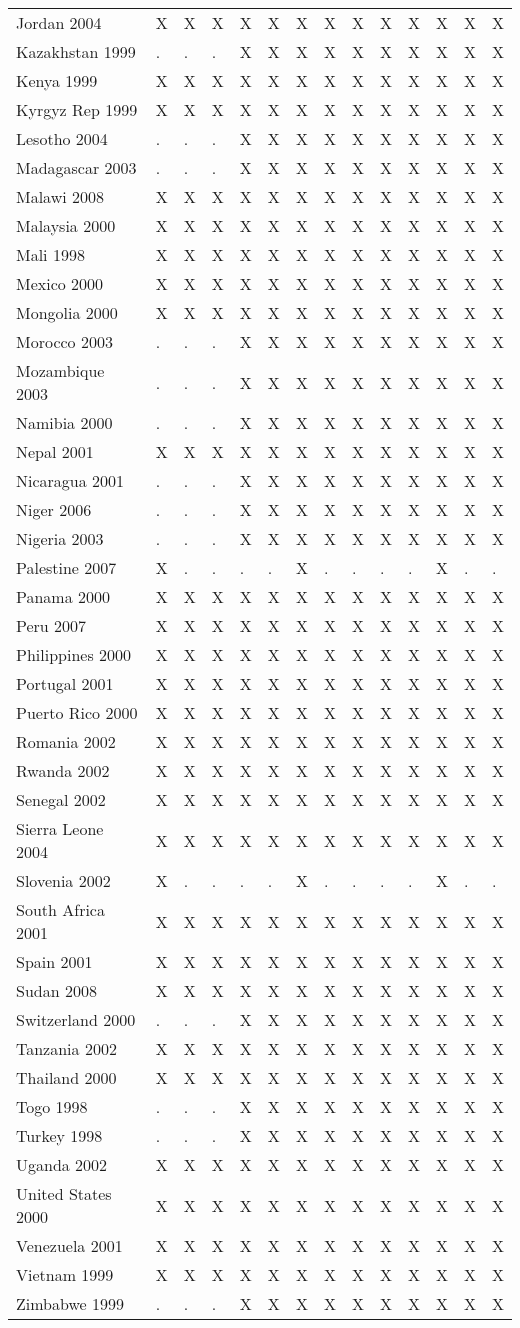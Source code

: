 \documentclass[a4paper]{article}
\begin{document}
\begin{longtable}{llllllllllllll}
Jordan 2004&X&X&X&X&X&X&X&X&X&X&X&X&X\tabularnewline
Kazakhstan 1999&.&.&.&X&X&X&X&X&X&X&X&X&X\tabularnewline
Kenya 1999&X&X&X&X&X&X&X&X&X&X&X&X&X\tabularnewline
Kyrgyz Rep 1999&X&X&X&X&X&X&X&X&X&X&X&X&X\tabularnewline
Lesotho 2004&.&.&.&X&X&X&X&X&X&X&X&X&X\tabularnewline
Madagascar 2003&.&.&.&X&X&X&X&X&X&X&X&X&X\tabularnewline
Malawi 2008&X&X&X&X&X&X&X&X&X&X&X&X&X\tabularnewline
Malaysia 2000&X&X&X&X&X&X&X&X&X&X&X&X&X\tabularnewline
Mali 1998&X&X&X&X&X&X&X&X&X&X&X&X&X\tabularnewline
\newpage
Mexico 2000&X&X&X&X&X&X&X&X&X&X&X&X&X\tabularnewline
Mongolia 2000&X&X&X&X&X&X&X&X&X&X&X&X&X\tabularnewline
Morocco 2003&.&.&.&X&X&X&X&X&X&X&X&X&X\tabularnewline
Mozambique 2003&.&.&.&X&X&X&X&X&X&X&X&X&X\tabularnewline
Namibia 2000&.&.&.&X&X&X&X&X&X&X&X&X&X\tabularnewline
Nepal 2001&X&X&X&X&X&X&X&X&X&X&X&X&X\tabularnewline
Nicaragua 2001&.&.&.&X&X&X&X&X&X&X&X&X&X\tabularnewline
Niger 2006&.&.&.&X&X&X&X&X&X&X&X&X&X\tabularnewline
Nigeria 2003&.&.&.&X&X&X&X&X&X&X&X&X&X\tabularnewline
Palestine 2007&X&.&.&.&.&X&.&.&.&.&X&.&.\tabularnewline
Panama 2000&X&X&X&X&X&X&X&X&X&X&X&X&X\tabularnewline
Peru 2007&X&X&X&X&X&X&X&X&X&X&X&X&X\tabularnewline
Philippines 2000&X&X&X&X&X&X&X&X&X&X&X&X&X\tabularnewline
Portugal 2001&X&X&X&X&X&X&X&X&X&X&X&X&X\tabularnewline
Puerto Rico 2000&X&X&X&X&X&X&X&X&X&X&X&X&X\tabularnewline
Romania 2002&X&X&X&X&X&X&X&X&X&X&X&X&X\tabularnewline
Rwanda 2002&X&X&X&X&X&X&X&X&X&X&X&X&X\tabularnewline
Senegal 2002&X&X&X&X&X&X&X&X&X&X&X&X&X\tabularnewline
Sierra Leone 2004&X&X&X&X&X&X&X&X&X&X&X&X&X\tabularnewline
Slovenia 2002&X&.&.&.&.&X&.&.&.&.&X&.&.\tabularnewline
South Africa 2001&X&X&X&X&X&X&X&X&X&X&X&X&X\tabularnewline
Spain 2001&X&X&X&X&X&X&X&X&X&X&X&X&X\tabularnewline
Sudan 2008&X&X&X&X&X&X&X&X&X&X&X&X&X\tabularnewline
Switzerland 2000&.&.&.&X&X&X&X&X&X&X&X&X&X\tabularnewline
Tanzania 2002&X&X&X&X&X&X&X&X&X&X&X&X&X\tabularnewline
Thailand 2000&X&X&X&X&X&X&X&X&X&X&X&X&X\tabularnewline
Togo 1998&.&.&.&X&X&X&X&X&X&X&X&X&X\tabularnewline
Turkey 1998&.&.&.&X&X&X&X&X&X&X&X&X&X\tabularnewline
Uganda 2002&X&X&X&X&X&X&X&X&X&X&X&X&X\tabularnewline
United States 2000&X&X&X&X&X&X&X&X&X&X&X&X&X\tabularnewline
Venezuela 2001&X&X&X&X&X&X&X&X&X&X&X&X&X\tabularnewline
Vietnam 1999&X&X&X&X&X&X&X&X&X&X&X&X&X\tabularnewline
Zimbabwe 1999&.&.&.&X&X&X&X&X&X&X&X&X&X\tabularnewline
\hline
 \end{longtable}
\end{document}
